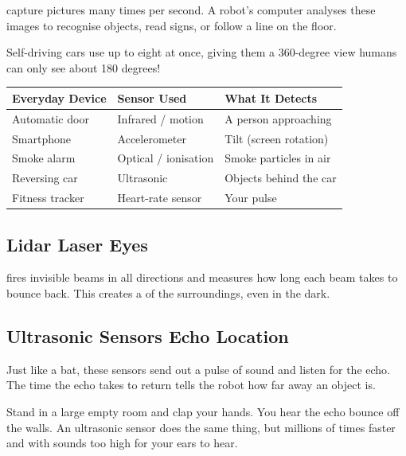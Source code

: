  capture pictures many times per second. A robot's computer analyses
these images to recognise objects, read signs, or follow a line on the floor.

\begin{funfact}
  Self-driving cars use up to eight  at once, giving them a
  360-degree view \textemdash{} humans can only see about 180 degrees!
\end{funfact}


\begin{center}
\begin{tabularx}{0.88\textwidth}{|X|X|X|}
  \hline
  \textbf{Everyday Device} & \textbf{Sensor Used} & \textbf{What It Detects} \\
  \hline
  Automatic door & Infrared / motion & A person approaching \\
  \hline
  Smartphone & Accelerometer & Tilt (screen rotation) \\
  \hline
  Smoke alarm & Optical / ionisation & Smoke particles in air \\
  \hline
  Reversing car & Ultrasonic & Objects behind the car \\
  \hline
  Fitness tracker & Heart-rate sensor & Your pulse \\
  \hline
\end{tabularx}
\end{center}

\sectionrule

\subsection*{Lidar \textemdash{} Laser Eyes}

 fires invisible  beams in all directions and measures
how long each beam takes to bounce back. This creates a  of the
surroundings, even in the dark.

\subsection*{Ultrasonic Sensors \textemdash{} Echo Location}

Just like a bat, these  sensors send out a pulse of sound and listen for the
echo. The time the echo takes to return tells the robot how far away an
object is.

\begin{picturethis}
  Stand in a large empty room and clap your hands. You hear the echo
  bounce off the walls. An ultrasonic sensor does the same thing, but
  millions of times faster and with sounds too high for your ears to hear.
\end{picturethis}

